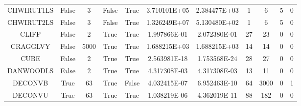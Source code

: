 \begin{longtable}{ccccccccccc}
	\cellcolor{default1} CHWIRUT1LS& \cellcolor{default1} False& \cellcolor{default1} 3& \cellcolor{default1} False& \cellcolor{default1} True& \cellcolor{poor} 3.710101E+05& \cellcolor{best} 2.384477E+03& \cellcolor{best} 1& \cellcolor{poor} 6& \cellcolor{default1} 5& \cellcolor{default1} 0\\
	\cellcolor{default2} CHWIRUT2LS& \cellcolor{default2} False& \cellcolor{default2} 3& \cellcolor{default2} False& \cellcolor{default2} True& \cellcolor{poor} 1.326249E+07& \cellcolor{best} 5.130480E+02& \cellcolor{best} 1& \cellcolor{poor} 6& \cellcolor{default2} 5& \cellcolor{default2} 0\\
	\cellcolor{default1} CLIFF& \cellcolor{default1} False& \cellcolor{default1} 2& \cellcolor{default1} True& \cellcolor{default1} True& \cellcolor{best} 1.997866E-01& \cellcolor{poor} 2.072380E-01& \cellcolor{ok} 27& \cellcolor{best} 23& \cellcolor{default1} 0& \cellcolor{default1} 0\\
	\cellcolor{default2} CRAGGLVY& \cellcolor{default2} False& \cellcolor{default2} 5000& \cellcolor{default2} True& \cellcolor{default2} True& \cellcolor{ok} 1.688215E+03& \cellcolor{best} 1.688215E+03& \cellcolor{best} 14& \cellcolor{best} 14& \cellcolor{default2} 0& \cellcolor{default2} 0\\
	\cellcolor{default1} CUBE& \cellcolor{default1} False& \cellcolor{default1} 2& \cellcolor{default1} True& \cellcolor{default1} True& \cellcolor{ok} 2.563981E-18& \cellcolor{best} 1.753568E-24& \cellcolor{ok} 28& \cellcolor{best} 27& \cellcolor{default1} 0& \cellcolor{default1} 0\\
	\cellcolor{default2} DANWOODLS& \cellcolor{default2} False& \cellcolor{default2} 2& \cellcolor{default2} True& \cellcolor{default2} True& \cellcolor{ok} 4.317308E-03& \cellcolor{best} 4.317308E-03& \cellcolor{ok} 13& \cellcolor{best} 11& \cellcolor{default2} 0& \cellcolor{default2} 0\\
	\cellcolor{default1} DECONVB& \cellcolor{default1} True& \cellcolor{default1} 63& \cellcolor{default1} True& \cellcolor{default1} False& \cellcolor{ok} 4.032415E-07& \cellcolor{best} 6.952463E-10& \cellcolor{best} 64& \cellcolor{poor} 3000& \cellcolor{default1} 0& \cellcolor{default1} 1\\
	\cellcolor{default2} DECONVU& \cellcolor{default2} True& \cellcolor{default2} 63& \cellcolor{default2} True& \cellcolor{default2} True& \cellcolor{ok} 1.038219E-06& \cellcolor{best} 4.362019E-11& \cellcolor{best} 88& \cellcolor{poor} 182& \cellcolor{default2} 0& \cellcolor{default2} 0\\

\end{longtable}

